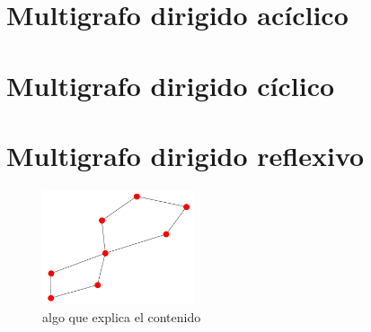 \documentclass{article}
\begin{document}
\section{Multigrafo dirigido ac\'iclico}

\section{Multigrafo dirigido c\'iclico}

\section{Multigrafo dirigido reflexivo}


\begin{figure}
\centering     
\includegraphics[width=45mm]{fig1.png}
\caption{algo que explica el contenido}
\label{fig:seq1}
\end{figure}
\end{document}
